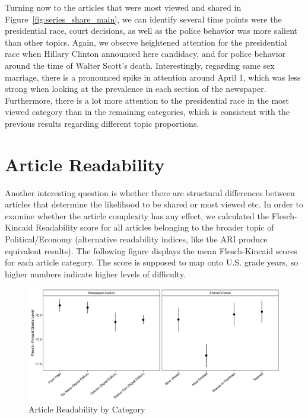 \documentclass[12pt]{article}
\begin{document}
\begin{doublespace}
Turning now to the articles that were most viewed and shared in Figure~\ref{fig:series_share_main}, we can identify several time points were the presidential race, court decisions, as well as the police behavior was more salient than other topics. Again, we observe heightened attention for the presidential race when Hillary Clinton announced here candidacy, and for police behavior around the time of Walter Scott's death. Interestingly, regarding same sex marriage, there is a pronounced spike in attention around April 1, which was less strong when looking at the prevalence in each section of the newspaper. Furthermore, there is a lot more attention to the presidential race in the most viewed category than in the remaining categories, which is consistent with the previous results regarding different topic proportions.


\section{Article Readability}

Another interesting question is whether there are structural differences between articles that determine the likelihood to be shared or most viewed etc. In order to examine whether the article complexity has any effect, we calculated the Flesch-Kincaid Readability score for all articles belonging to the broader topic of Political/Economy (alternative readability indices, like the ARI produce equivalent results). The following figure displays the mean Flesch-Kincaid scores for each article category. The score is supposed to map onto U.S. grade years, so higher numbers indicate higher levels of difficulty.

\begin{figure}[h]
\caption{Article Readability by Category}\label{fig:readability}
\includegraphics[width=\textwidth]{../calc/fig/readability}
\end{figure}


\end{doublespace}
\end{document}
